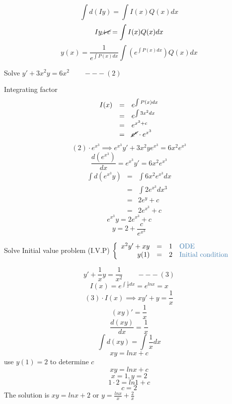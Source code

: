 \[\displaystyle \int d(Iy) = \int I(x)Q(x)dx\]
\[\displaystyle Iy \cancel{+ c} = \int I(x)Q(x)dx\]
\[y(x) = \displaystyle \frac{1}{e^{\int P(x)dx}} \int (e^{\int P(x)dx})Q(x)dx\]
\begin{eg}
Solve \(y' + 3x^2y = 6x^2 \quad \quad ---(2)\)

\soln Integrating factor
\[\begin{array}{rcl}
I(x) & = & e^{\int P(x)dx}\\
& = & e^{\int 3x^2dx}\\
& = & e^{x^3 + c}\\
& = & \cancel{e^c} \cdot e^{x^3}
\end{array}\]
\[(2) \cdot e^{x^3} \implies e^{x^3}y' + 3x^2ye^{x^3} = 6x^2e^{x^3}\]
\[\displaystyle \frac{d(e^{x^3})}{dx} = e^{x^3}y' = 6x^2e^{x^3}\]
\[\begin{array}{rcl}
\displaystyle \int d(e^{x^3}y) & = & \displaystyle \int 6x^2e^{x^3}dx\\
& = & \int 2e^{x^3} dx^3\\
& = & 2e^y+c\\
& = & 2e^{x^3} +c
\end{array}\]
\[e^{x^3} y = 2e^{x^3} + c\]
\[y = \displaystyle 2 + \frac{c}{e^{x^3}}\]
\end{eg}
\begin{eg}
Solve Initial value problem (I.V.P) \(\left\{ \begin{array}{rcl}
x^2y' + xy & = & 1 \quad \text{\tssteelblue{ODE}}\\
y(1) & = & 2 \quad \text{\tssteelblue{Initial condition}}
\end{array} \right.\)

\soln 
\[\displaystyle y' + \frac{1}{x}y = \frac{1}{x^2} \quad \quad ---(3)\]
\[I(x) = e^{\int \frac{1}{x}dx} = e^{ln x} = x\]
\[(3) \cdot I(x) \implies xy' + y = \frac{1}{x}\]
\[(xy)' = \frac{1}{x}\]
\[\displaystyle \frac{d(xy)}{dx} = \frac{1}{x}\]
\[\displaystyle \int d(xy) = \int \frac{1}{x} dx\]
\[xy = ln x +c\]
use \(y(1) = 2\) to determine \(c\)
\[xy = ln x +c\]
\[x=1, y=2\]
\[1 \cdot 2 = ln 1 +c\]
\[c = 2\]
The solution is \(xy = ln x + 2 \text{ or } y = \displaystyle \frac{lnx}{x} + \frac{2}{x}\)
\end{eg}
